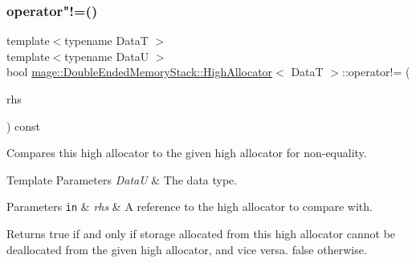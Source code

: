 \subsubsection{\texorpdfstring{operator"!=()}{operator!=()}}
{\footnotesize\ttfamily template$<$typename DataT $>$ \\
template$<$typename DataU $>$ \\
bool \hyperlink{structmage_1_1_double_ended_memory_stack_1_1_high_allocator}{mage\+::\+Double\+Ended\+Memory\+Stack\+::\+High\+Allocator}$<$ DataT $>$\+::operator!= (\begin{DoxyParamCaption}\item[{const \hyperlink{structmage_1_1_double_ended_memory_stack_1_1_high_allocator}{High\+Allocator}$<$ DataU $>$ \&}]{rhs }\end{DoxyParamCaption}) const\hspace{0.3cm}{\ttfamily [noexcept]}}

Compares this high allocator to the given high allocator for non-\/equality.


\begin{DoxyTemplParams}{Template Parameters}
{\em DataU} & The data type. \\
\hline
\end{DoxyTemplParams}

\begin{DoxyParams}[1]{Parameters}
\mbox{\tt in}  & {\em rhs} & A reference to the high allocator to compare with. \\
\hline
\end{DoxyParams}
\begin{DoxyReturn}{Returns}
{\ttfamily true} if and only if storage allocated from this high allocator cannot be deallocated from the given high allocator, and vice versa. {\ttfamily false} otherwise. 
\end{DoxyReturn}
\hypertarget{structmage_1_1_double_ended_memory_stack_1_1_high_allocator_ab9d94cbf9334b14208006202746e9077}{}\label{structmage_1_1_double_ended_memory_stack_1_1_high_allocator_ab9d94cbf9334b14208006202746e9077} 
